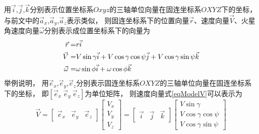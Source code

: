 用$\vec{i}$,$\vec{j}$,$\vec{k}$分别表示位置坐标系$Oxyz$的三轴单位向量在固连坐标系$OXYZ$下的坐标，
与前文中的$\vec{a}_x$,$\vec{a}_y$,$\vec{a}_z$表示类似，
则固连坐标系下的位置向量$\vec{r}$、速度向量$\vec{V}$、火星角速度向量$\vec{\omega}$分别表示成位置坐标系下的向量为
\begin{align}
    \vec{r} =& r\vec{i} \label{eqModelr}\\
    \vec{V} =& V\sin\gamma\vec{i} + V\cos\gamma\cos\psi\vec{j} + V\cos\gamma\sin\psi\vec{k} \label{eqModelV}\\
    \vec{\omega} =& \omega\sin\phi\vec{i} + \omega\cos\phi\vec{k} \notag
\end{align}
举例说明，
用$\vec{e}_x$,$\vec{e}_y$,$\vec{e}_z$分别表示固连坐标系$OXYZ$的三轴单位向量在固连坐标系下的坐标，
即$[\vec{e}_x\ \vec{e}_y\ \vec{e}_z]$为单位矩阵，
则速度向量式\eqref{eqModelV}可以表示为
\begin{equation*}
    \vec{V}
    =\left[\begin{matrix}
        \vec{e}_x & \vec{e}_y & \vec{e}_z
    \end{matrix}\right]
    \left[\begin{matrix}
        V_x \\ V_y \\ V_z
    \end{matrix}\right]
    =\left[\begin{matrix}
        \vec{i} & \vec{j} & \vec{k}
    \end{matrix}\right]
    \left[\begin{matrix}
        V\sin\gamma \\ V\cos\gamma\cos\psi \\ V\cos\gamma\sin\psi
    \end{matrix}\right]
\end{equation*}

